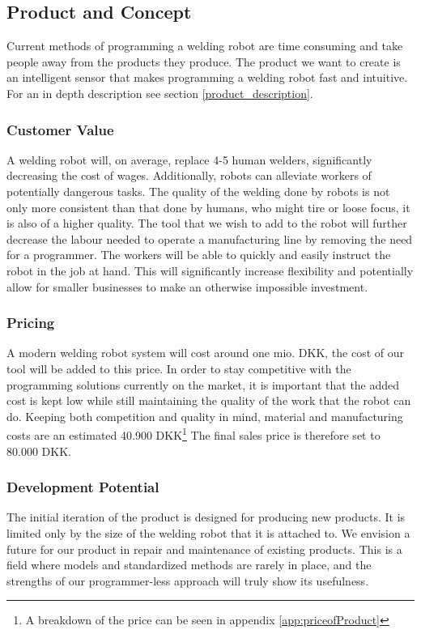 \subsection{Product and Concept}
Current methods of programming a welding robot are time consuming and take people away from the products they produce.
The product we want to create is an intelligent sensor that makes programming a welding robot fast and intuitive. 
For an in depth description see section \ref{product_description}.
\subsubsection{Customer Value}
A welding robot will, on average, replace 4-5 human welders, significantly decreasing the cost of wages. Additionally, robots can alleviate workers of potentially dangerous tasks. The quality of the welding done by robots is not only more consistent than that done by humans, who might tire or loose focus, it is also of a higher quality. The tool that we wish to add to the robot will further decrease the labour needed to operate a manufacturing line by removing the need for a programmer. The workers will be able to quickly and easily instruct the robot in the job at hand. This will significantly increase flexibility and potentially allow for smaller businesses to make an otherwise impossible investment.

\subsubsection{Pricing}
A modern welding robot system will cost around one mio. DKK, the cost of our tool will be added to this price. In order to stay competitive with the programming solutions currently on the market, it is important that the added cost is kept low while still maintaining the quality of the work that the robot can do. Keeping both competition and quality in mind, material and manufacturing costs are an estimated 40.900 DKK\footnote{A breakdown of the price can be seen in appendix \ref{app:priceofProduct}} 
The final sales price is therefore set to 80.000 DKK.

\subsubsection{Development Potential}
The initial iteration of the product is designed for producing new products. It is limited only by the size of the welding robot that it is attached to. We envision a future for our product in repair and maintenance of existing products. This is a field where models and standardized methods are rarely in place, and the strengths of our programmer-less approach will truly show its usefulness.

